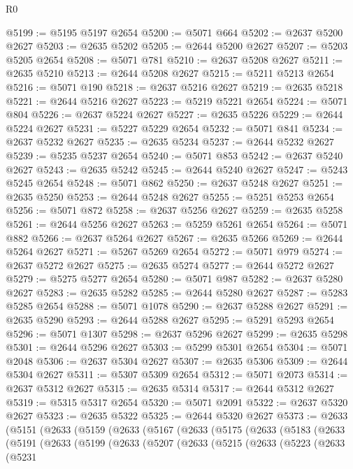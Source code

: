 \begin{lexlean}{R0}
\begin{coremodule}
@5199 := @5195 @5197 @2654
@5200 := @5071 @664
@5202 := @2637 @5200 @2627
@5203 := @2635 @5202
@5205 := @2644 @5200 @2627
@5207 := @5203 @5205 @2654
@5208 := @5071 @781
@5210 := @2637 @5208 @2627
@5211 := @2635 @5210
@5213 := @2644 @5208 @2627
@5215 := @5211 @5213 @2654
@5216 := @5071 @190
@5218 := @2637 @5216 @2627
@5219 := @2635 @5218
@5221 := @2644 @5216 @2627
@5223 := @5219 @5221 @2654
@5224 := @5071 @804
@5226 := @2637 @5224 @2627
@5227 := @2635 @5226
@5229 := @2644 @5224 @2627
@5231 := @5227 @5229 @2654
@5232 := @5071 @841
@5234 := @2637 @5232 @2627
@5235 := @2635 @5234
@5237 := @2644 @5232 @2627
@5239 := @5235 @5237 @2654
@5240 := @5071 @853
@5242 := @2637 @5240 @2627
@5243 := @2635 @5242
@5245 := @2644 @5240 @2627
@5247 := @5243 @5245 @2654
@5248 := @5071 @862
@5250 := @2637 @5248 @2627
@5251 := @2635 @5250
@5253 := @2644 @5248 @2627
@5255 := @5251 @5253 @2654
@5256 := @5071 @872
@5258 := @2637 @5256 @2627
@5259 := @2635 @5258
@5261 := @2644 @5256 @2627
@5263 := @5259 @5261 @2654
@5264 := @5071 @882
@5266 := @2637 @5264 @2627
@5267 := @2635 @5266
@5269 := @2644 @5264 @2627
@5271 := @5267 @5269 @2654
@5272 := @5071 @979
@5274 := @2637 @5272 @2627
@5275 := @2635 @5274
@5277 := @2644 @5272 @2627
@5279 := @5275 @5277 @2654
@5280 := @5071 @987
@5282 := @2637 @5280 @2627
@5283 := @2635 @5282
@5285 := @2644 @5280 @2627
@5287 := @5283 @5285 @2654
@5288 := @5071 @1078
@5290 := @2637 @5288 @2627
@5291 := @2635 @5290
@5293 := @2644 @5288 @2627
@5295 := @5291 @5293 @2654
@5296 := @5071 @1307
@5298 := @2637 @5296 @2627
@5299 := @2635 @5298
@5301 := @2644 @5296 @2627
@5303 := @5299 @5301 @2654
@5304 := @5071 @2048
@5306 := @2637 @5304 @2627
@5307 := @2635 @5306
@5309 := @2644 @5304 @2627
@5311 := @5307 @5309 @2654
@5312 := @5071 @2073
@5314 := @2637 @5312 @2627
@5315 := @2635 @5314
@5317 := @2644 @5312 @2627
@5319 := @5315 @5317 @2654
@5320 := @5071 @2091
@5322 := @2637 @5320 @2627
@5323 := @2635 @5322
@5325 := @2644 @5320 @2627
@5373 := @2633
    (@5151
      (@2633
        (@5159
          (@2633
            (@5167
              (@2633
                (@5175
                  (@2633
                    (@5183
                      (@2633
                        (@5191
                          (@2633
                            (@5199
                              (@2633
                                (@5207
                                  (@2633
                                    (@5215
                                      (@2633
                                        (@5223
                                          (@2633
                                            (@5231

\end{coremodule}
\end{lexlean}
